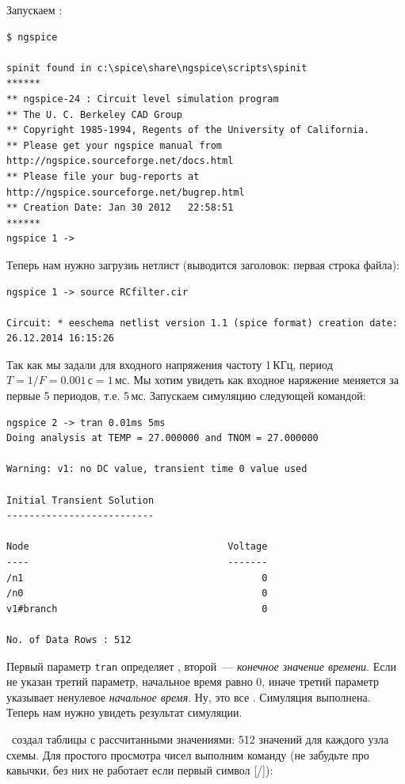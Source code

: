 Запускаем \ngs:

\begin{verbatim}
$ ngspice

spinit found in c:\spice\share\ngspice\scripts\spinit
******
** ngspice-24 : Circuit level simulation program
** The U. C. Berkeley CAD Group
** Copyright 1985-1994, Regents of the University of California.
** Please get your ngspice manual from http://ngspice.sourceforge.net/docs.html
** Please file your bug-reports at http://ngspice.sourceforge.net/bugrep.html
** Creation Date: Jan 30 2012   22:58:51
******
ngspice 1 ->
\end{verbatim}

Теперь нам нужно загрузиь нетлист (выводится заголовок: первая строка файла):

\begin{verbatim}
ngspice 1 -> source RCfilter.cir

Circuit: * eeschema netlist version 1.1 (spice format) creation date: 26.12.2014 16:15:26
\end{verbatim}

Так как мы задали для входного напряжения частоту 1\,КГц, период
$T=1/F=0.001$\,с$=1$\,мс.
Мы хотим увидеть как входное наряжение меняется за первые 5 периодов, т.е.
5\,мс. Запускаем симуляцию следующей командой:

\begin{verbatim}
ngspice 2 -> tran 0.01ms 5ms
Doing analysis at TEMP = 27.000000 and TNOM = 27.000000

Warning: v1: no DC value, transient time 0 value used

Initial Transient Solution
--------------------------

Node                                   Voltage
----                                   -------
/n1                                          0
/n0                                          0
v1#branch                                    0

No. of Data Rows : 512
\end{verbatim}

Первый параметр \verb|tran| определяет , второй\ ---
\emph{конечное значение времени}. Если не указан третий параметр,
начальное время равно 0, иначе третий параметр указывает ненулевое
\emph{начальное время}. Ну, это все \smiley. Симуляция выполнена. Теперь нам
нужно увидеть результат симуляции.


\spice\ создал таблицы с рассчитанными значениями: 512 значений для каждого узла
схемы. Для простого просмотра чисел выполним команду (не забудьте про кавычки,
без них не работает если первый символ [/]):

